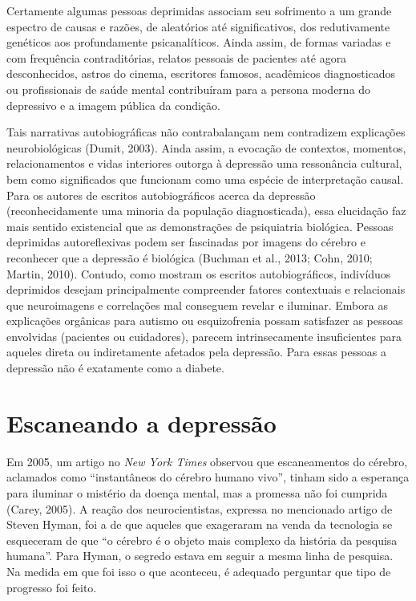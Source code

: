 Certamente algumas pessoas deprimidas associam seu sofrimento a um
grande espectro de causas e razões, de aleatórios até significativos,
dos redutivamente genéticos aos profundamente psicanalíticos. Ainda
assim, de formas variadas e com frequência contraditórias, relatos
pessoais de pacientes até agora desconhecidos, astros do cinema,
escritores famosos, acadêmicos diagnosticados ou profissionais de saúde
mental contribuíram para a persona moderna do depressivo e a imagem
pública da condição.

Tais narrativas autobiográficas não contrabalançam nem contradizem
explicações neurobiológicas (Dumit, 2003). Ainda assim, a evocação de
contextos, momentos, relacionamentos e vidas interiores outorga à
depressão uma ressonância cultural, bem como significados que funcionam
como uma espécie de interpretação causal. Para os autores de escritos
autobiográficos acerca da depressão (reconhecidamente uma minoria da
população diagnosticada), essa elucidação faz mais sentido existencial
que as demonstrações de psiquiatria biológica. Pessoas deprimidas
autoreflexivas podem ser fascinadas por imagens do cérebro e reconhecer
que a depressão é biológica (Buchman et al., 2013; Cohn, 2010; Martin,
2010). Contudo, como mostram os escritos autobiográficos, indivíduos
deprimidos desejam principalmente compreender fatores contextuais e
relacionais que neuroimagens e correlações mal conseguem revelar e
iluminar. Embora as explicações orgânicas para autismo ou esquizofrenia
possam satisfazer as pessoas envolvidas (pacientes ou cuidadores),
parecem intrinsecamente insuficientes para aqueles direta ou
indiretamente afetados pela depressão. Para essas pessoas a depressão
não é exatamente como a diabete.

\chapter{Escaneando a depressão}

Em 2005, um artigo no \emph{New York Times} observou que escaneamentos
do cérebro, aclamados como ``instantâneos do cérebro humano vivo'',
tinham sido a esperança para iluminar o mistério da doença mental, mas a
promessa não foi cumprida (Carey, 2005). A reação dos neurocientistas,
expressa no mencionado artigo de Steven Hyman, foi a de que aqueles que
exageraram na venda da tecnologia se esqueceram de que ``o cérebro é o
objeto mais complexo da história da pesquisa humana''. Para Hyman, o
segredo estava em seguir a mesma linha de pesquisa. Na medida em que foi
isso o que aconteceu, é adequado perguntar que tipo de progresso foi
feito.

